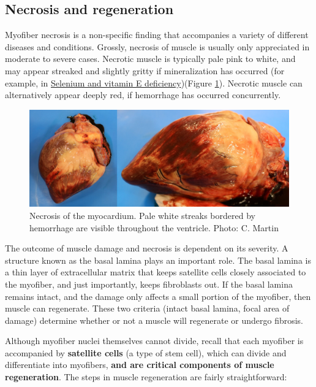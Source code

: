 \documentclass[openany]{book}
\begin{document}
\hypertarget{necrosis-and-regeneration}{\subsection{Necrosis and
regeneration}\label{necrosis-and-regeneration}}

Myofiber necrosis is a non-specific finding that accompanies a variety
of different diseases and conditions. Grossly, necrosis of muscle is
usually only appreciated in moderate to severe cases. Necrotic muscle is
typically pale pink to white, and may appear streaked and slightly
gritty if mineralization has occurred (for example, in
\protect\hyperlink{selenium-and-vitamin-e-deficiency}{Selenium and
vitamin E deficiency})(Figure \ref{fig:heart-necrosis}). Necrotic muscle
can alternatively appear deeply red, if hemorrhage has occurred
concurrently.

\begin{figure}

{\centering \includegraphics[width=0.6\linewidth]{images/heart-necrosis-comp} 

}

\caption{Necrosis of the myocardium. Pale white streaks bordered by hemorrhage are visible throughout the ventricle. Photo: C. Martin}\label{fig:heart-necrosis}
\end{figure}

The outcome of muscle damage and necrosis is dependent on its severity.
A structure known as the basal lamina plays an important role. The basal
lamina is a thin layer of extracellular matrix that keeps satellite
cells closely associated to the myofiber, and just importantly, keeps
fibroblasts out. If the basal lamina remains intact, and the damage only
affects a small portion of the myofiber, then muscle can regenerate.
These two criteria (intact basal lamina, focal area of damage) determine
whether or not a muscle will regenerate or undergo fibrosis.

Although myofiber nuclei themselves cannot divide, recall that each
myofiber is accompanied by \textbf{satellite cells} (a type of stem
cell), which can divide and differentiate into myofibers, \textbf{and
are critical components of muscle regeneration}. The steps in muscle
regeneration are fairly straightforward:
\end{document}
